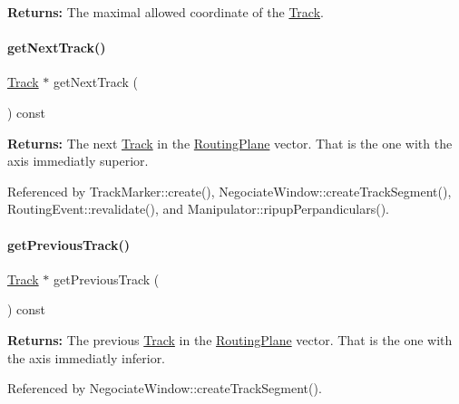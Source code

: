 {\bfseries Returns\+:} The maximal allowed coordinate of the \hyperlink{classKite_1_1Track}{Track}. \mbox{\label{classKite_1_1Track_a1b8af68504f2de84cb85cf25e30f93bd}} 
\paragraph{\texorpdfstring{get\+Next\+Track()}{getNextTrack()}}
{\footnotesize\ttfamily \hyperlink{classKite_1_1Track}{Track} $\ast$ get\+Next\+Track (\begin{DoxyParamCaption}{ }\end{DoxyParamCaption}) const}

{\bfseries Returns\+:} The next \hyperlink{classKite_1_1Track}{Track} in the {\ttfamily \hyperlink{classKite_1_1RoutingPlane}{Routing\+Plane}} vector. That is the one with the axis immediatly superior. 

Referenced by Track\+Marker\+::create(), Negociate\+Window\+::create\+Track\+Segment(), Routing\+Event\+::revalidate(), and Manipulator\+::ripup\+Perpandiculars().

\mbox{\label{classKite_1_1Track_a984171d836a7f61df95e74beeddcf6b5}} 
\paragraph{\texorpdfstring{get\+Previous\+Track()}{getPreviousTrack()}}
{\footnotesize\ttfamily \hyperlink{classKite_1_1Track}{Track} $\ast$ get\+Previous\+Track (\begin{DoxyParamCaption}{ }\end{DoxyParamCaption}) const}

{\bfseries Returns\+:} The previous \hyperlink{classKite_1_1Track}{Track} in the {\ttfamily \hyperlink{classKite_1_1RoutingPlane}{Routing\+Plane}} vector. That is the one with the axis immediatly inferior. 

Referenced by Negociate\+Window\+::create\+Track\+Segment().

\mbox{\label{classKite_1_1Track_a9be1e4285daa77fe397767c097fbdc66}} 
